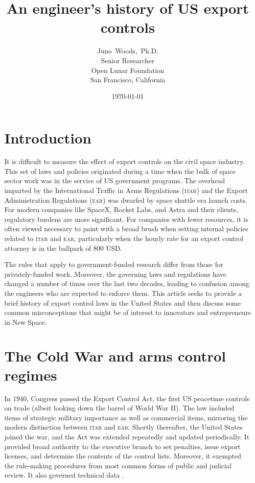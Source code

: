 \documentclass[12pt]{olfmemo}
\title{An engineer's history of US export controls}
\author{
        Juno~Woods,~Ph.D. \\
        Senior Researcher\\
        Open Lunar Foundation\\
        San Francisco, California
}
\date{\today}
\begin{document}
\maketitle

\section{Introduction}
It is difficult to measure the effect of export controls on the civil space industry. This set of laws and policies originated during a time when the bulk of space sector work was in the service of US government programs. The overhead imparted by the International Traffic in Arms Regulations (\textsc{itar}) and the Export Administration Regulations (\textsc{ear}) was dwarfed by space shuttle era launch costs. For modern companies like SpaceX, Rocket Labs, and Astra and their clients, regulatory burdens are more significant. For companies with fewer resources, it is often viewed necessary to paint with a broad brush when setting internal policies related to \textsc{itar} and \textsc{ear}, particularly when the hourly rate for an export control attorney is in the ballpark of 800 USD.

The rules that apply to government-funded research differ from those for privately-funded work. Moreover, the governing laws and regulations have changed a number of times over the last two decades, leading to confusion among the engineers who are expected to enforce them. This article seeks to provide a brief history of export control laws in the United States and then discuss some common misconceptions that might be of interest to innovators and entrepreneurs in New Space.

\section{The Cold War and arms control regimes}
In 1940, Congress passed the Export Control Act, the first US peacetime controls on trade (albeit looking down the barrel of World War II). The law included items of strategic military importance as well as commercial items, mirroring the modern distinction between \textsc{itar} and \textsc{ear}. Shortly thereafter, the United States joined the war, and the Act was extended repeatedly and updated periodically. It provided broad authority to the executive branch to set penalties, issue export licenses, and determine the contents of the control lists. Moreover, it exempted the rule-making procedures from most common forms of public and judicial review. It also governed technical data \citep{NAP1987}.
\end{document}
